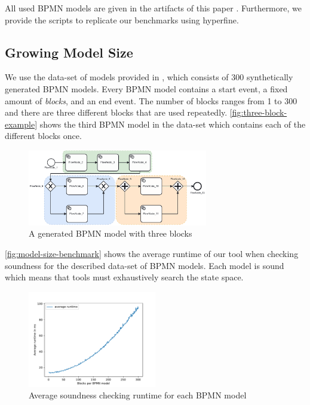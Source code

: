 \documentclass[runningheads]{llncs}
\begin{document}
All used BPMN models are given in the artifacts of this paper \cite{noauthorgivenBPM2024Artifacts2024}.
Furthermore, we provide the scripts to replicate our benchmarks using hyperfine.

\subsection{Growing Model Size} \label{subsec:model-size}
We use the data-set of models provided in 
\cite{krauterHigherorderTransformationApproach2023}, which consists of 300 synthetically generated BPMN models.
Every BPMN model contains a start event, a fixed amount of \textit{blocks}, and an end event.
The number of blocks ranges from 1 to 300 and there are three different blocks that are used repeatedly.
\autoref{fig:three-block-example} shows the third BPMN model in the data-set which contains each of the different blocks once.

\begin{figure}[ht]
	\centering
	\includegraphics[width=0.7\textwidth]{images/three-blocks}
	\caption{A generated BPMN model with three blocks \cite{krauterHigherorderTransformationApproach2023}}
	\label{fig:three-block-example}
\end{figure}

\autoref{fig:model-size-benchmark} shows the average runtime of our tool when checking soundness for the described data-set of BPMN models.
Each model is sound which means that tools must exhaustively search the state space.

\begin{figure}[ht]
	\centering
	\includegraphics[width=0.5\textwidth]{images/model-size-benchmark}
	\caption{Average soundness checking runtime for each BPMN model}
	\label{fig:model-size-benchmark}
\end{figure}
\end{document}
